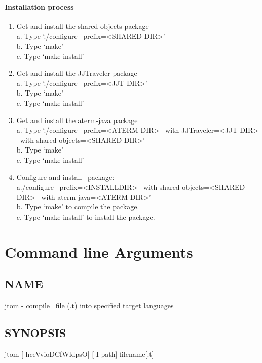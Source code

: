 \paragraph{Installation process}
\begin{enumerate}
\item Get and install the shared-objects package
\\ a. Type `./configure --prefix=<SHARED-DIR>'
\\ b. Type `make'
\\ c. Type `make install'
\item Get and install the JJTraveler package
\\ a. Type `./configure --prefix=<JJT-DIR>'
\\ b. Type `make'
\\ c. Type `make install'
\item Get and install the aterm-java package
\\ a. Type `./configure --prefix=<ATERM-DIR>
--with-JJTraveler=<JJT-DIR> --with-shared-objects=<SHARED-DIR>' 
\\ b. Type `make'
\\ c. Type `make install'

\item Configure and install \TOM\ package:
\\ a./configure --prefix=<INSTALLDIR>
--with-shared-objects=<SHARED-DIR> --with-aterm-java=<ATERM-DIR>'
\\ b. Type `make' to compile the package.
\\ c. Type `make install' to install the package.
\end{enumerate}


\section{Command line Arguments}
\subsection{NAME}
     jtom - compile \TOM\ file (.t) into specified target languages

\subsection{SYNOPSIS}
     jtom [-hceVvioDCfWldpsO] [-I path] filename[.t]

